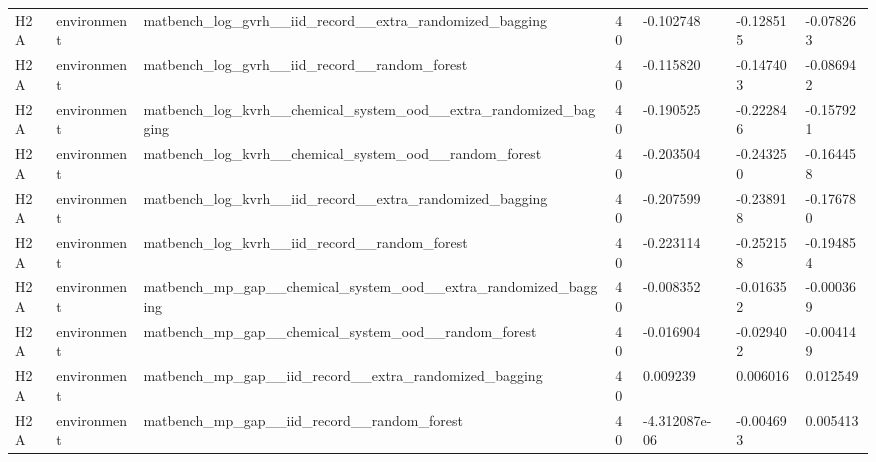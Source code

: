 \documentclass[10pt]{article}
\begin{document}
\begin{landscape}
\begin{longtable}{L{.35in}L{.6in}L{3.55in}L{.4in}L{.88in}L{.88in}L{.88in}}
H2A & environment & matbench\_\allowbreak{}log\_\allowbreak{}gvrh\_\allowbreak{}\_\allowbreak{}iid\_\allowbreak{}record\_\allowbreak{}\_\allowbreak{}extra\_\allowbreak{}randomized\_\allowbreak{}bagging & 40 & -0.102748 & -0.128515 & -0.078263\\
H2A & environment & matbench\_\allowbreak{}log\_\allowbreak{}gvrh\_\allowbreak{}\_\allowbreak{}iid\_\allowbreak{}record\_\allowbreak{}\_\allowbreak{}random\_\allowbreak{}forest & 40 & -0.115820 & -0.147403 & -0.086942\\
H2A & environment & matbench\_\allowbreak{}log\_\allowbreak{}kvrh\_\allowbreak{}\_\allowbreak{}chemical\_\allowbreak{}system\_\allowbreak{}ood\_\allowbreak{}\_\allowbreak{}extra\_\allowbreak{}randomized\_\allowbreak{}bagging & 40 & -0.190525 & -0.222846 & -0.157921\\
H2A & environment & matbench\_\allowbreak{}log\_\allowbreak{}kvrh\_\allowbreak{}\_\allowbreak{}chemical\_\allowbreak{}system\_\allowbreak{}ood\_\allowbreak{}\_\allowbreak{}random\_\allowbreak{}forest & 40 & -0.203504 & -0.243250 & -0.164458\\
H2A & environment & matbench\_\allowbreak{}log\_\allowbreak{}kvrh\_\allowbreak{}\_\allowbreak{}iid\_\allowbreak{}record\_\allowbreak{}\_\allowbreak{}extra\_\allowbreak{}randomized\_\allowbreak{}bagging & 40 & -0.207599 & -0.238918 & -0.176780\\
H2A & environment & matbench\_\allowbreak{}log\_\allowbreak{}kvrh\_\allowbreak{}\_\allowbreak{}iid\_\allowbreak{}record\_\allowbreak{}\_\allowbreak{}random\_\allowbreak{}forest & 40 & -0.223114 & -0.252158 & -0.194854\\
H2A & environment & matbench\_\allowbreak{}mp\_\allowbreak{}gap\_\allowbreak{}\_\allowbreak{}chemical\_\allowbreak{}system\_\allowbreak{}ood\_\allowbreak{}\_\allowbreak{}extra\_\allowbreak{}randomized\_\allowbreak{}bagging & 40 & -0.008352 & -0.016352 & -0.000369\\
H2A & environment & matbench\_\allowbreak{}mp\_\allowbreak{}gap\_\allowbreak{}\_\allowbreak{}chemical\_\allowbreak{}system\_\allowbreak{}ood\_\allowbreak{}\_\allowbreak{}random\_\allowbreak{}forest & 40 & -0.016904 & -0.029402 & -0.004149\\
H2A & environment & matbench\_\allowbreak{}mp\_\allowbreak{}gap\_\allowbreak{}\_\allowbreak{}iid\_\allowbreak{}record\_\allowbreak{}\_\allowbreak{}extra\_\allowbreak{}randomized\_\allowbreak{}bagging & 40 & 0.009239 & 0.006016 & 0.012549\\
H2A & environment & matbench\_\allowbreak{}mp\_\allowbreak{}gap\_\allowbreak{}\_\allowbreak{}iid\_\allowbreak{}record\_\allowbreak{}\_\allowbreak{}random\_\allowbreak{}forest & 40 & -4.312087e-06 & -0.004693 & 0.005413\\

\end{longtable}
\end{landscape}
\end{document}
